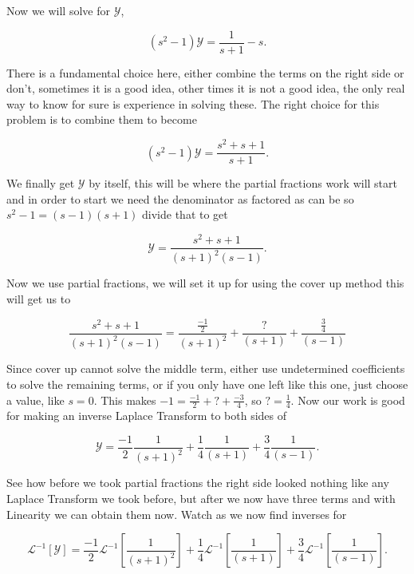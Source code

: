 \documentclass[12pt]{article}
\newcommand{\lp}{\mathscr{L}}
\newcommand{\hugey}{\mathscr{Y}}
\begin{document}
Now we will solve for $\hugey$,

\begin{equation*}
    (s^2-1)\hugey = \frac{1}{s+1}-s.
\end{equation*}

There is a fundamental choice here, either combine the terms on the right side or don't, sometimes it is a good idea, other times it is not a good idea, the only real way to know for sure is experience in solving these. The right choice for this problem is to combine them to become

\begin{equation*}
    (s^2-1)\hugey = \frac{s^2+s+1}{s+1}.
\end{equation*}

We finally get $\hugey$ by itself, this will be where the partial fractions work will start and in order to start we need the denominator as factored as can be so $s^2-1=(s-1)(s+1)$ divide that to get

\begin{equation*}
    \hugey = \frac{s^2+s+1}{(s+1)^2(s-1)}.
\end{equation*}

Now we use partial fractions, we will set it up for using the cover up method this will get us to

\begin{equation*}
    \frac{s^2+s+1}{(s+1)^2(s-1)}=\frac{\frac{-1}{2}}{(s+1)^2}+\frac{?}{(s+1)}+\frac{\frac{3}{4}}{(s-1)}
\end{equation*}

Since cover up cannot solve the middle term, either use undetermined coefficients to solve the remaining terms, or if you only have one left like this one, just choose a value, like $s=0$. This makes $-1=\frac{-1}{2}+?+\frac{-3}{4}$, so $?=\frac{1}{4}$. Now our work is good for making an inverse Laplace Transform to both sides of

\begin{equation*}
    \hugey = \frac{-1}{2}\frac{1}{(s+1)^2}+\frac{1}{4}\frac{1}{(s+1)}+\frac{3}{4}\frac{1}{(s-1)}.
\end{equation*}

See how before we took partial fractions the right side looked nothing like any Laplace Transform we took before, but after we now have three terms and with Linearity we can obtain them now. Watch as we now find inverses for

\begin{equation*}
    \lp^{-1}[\hugey] = \frac{-1}{2}\lp^{-1}\left[\frac{1}{(s+1)^2}\right]+\frac{1}{4}\lp^{-1}\left[\frac{1}{(s+1)}\right]+\frac{3}{4}\lp^{-1}\left[\frac{1}{(s-1)}\right].
\end{equation*}
\end{document}
